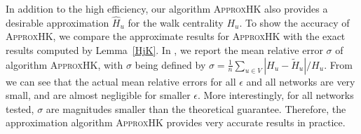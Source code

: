 \documentclass[10pt,twocolumn,twoside]{IEEEtran}
\begin{document}
In addition to the high efficiency,  our algorithm  \textsc{ApproxHK} also provides a desirable approximation \(\hat{H}_u\) for the walk centrality \(H_u\).   To show the accuracy of  \textsc{ApproxHK}, we compare the  approximate  results for \textsc{ApproxHK} with the exact results computed by  Lemma~\ref{HjK}. In , we report the mean relative error \(\sigma\) of algorithm  \textsc{ApproxHK}, with \(\sigma\) being defined by \(\sigma=\frac{1}{n}\sum_{u\in V}|{H_u}-\tilde{H}_u|/{H_u}\). From   we can see that  the actual mean relative errors for all \(\epsilon\) and all networks are  very small, and are almost negligible for smaller \(\epsilon\). More interestingly, for all networks tested,   \(\sigma\) are magnitudes smaller than the theoretical guarantee. Therefore, the  approximation algorithm  \textsc{ApproxHK} provides very accurate results in practice.
\end{document}
